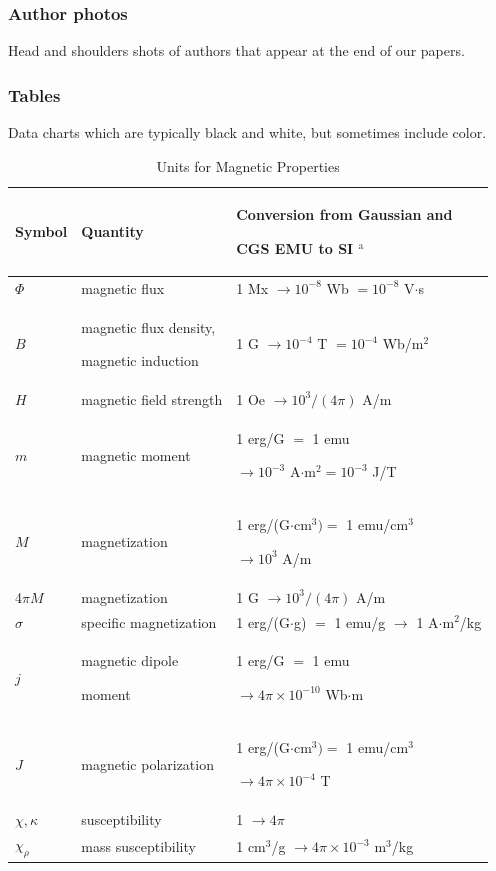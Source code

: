 \documentclass[journal,twoside,web]{ieeecolor}
\begin{document}
\subsubsection{Author photos}
{Head and shoulders shots of authors that appear at the end of our papers. }

\subsubsection{Tables}
{Data charts which are typically black and white, but sometimes include 
color.}

\begin{table}
\caption{Units for Magnetic Properties}
\label{table}
\setlength{\tabcolsep}{3pt}
\begin{tabular}{p{25pt}p{75pt}p{115pt}}
\hline\hline
Symbol& 
Quantity& 
Conversion from Gaussian and \par CGS EMU to SI $^{\mathrm{a}}$ \\
\hline
$\Phi $& 
magnetic flux& 
1 Mx $\to  10^{-8}$ Wb $= 10^{-8}$ V$\cdot $s \\
$B$& 
magnetic flux density, \par magnetic induction& 
1 G $\to  10^{-4}$ T $= 10^{-4}$ Wb/m$^{2}$ \\
$H$& 
magnetic field strength& 
1 Oe $\to  10^{3}/(4\pi )$ A/m \\
$m$& 
magnetic moment& 
1 erg/G $=$ 1 emu \par $\to 10^{-3}$ A$\cdot $m$^{2} = 10^{-3}$ J/T \\
$M$& 
magnetization& 
1 erg/(G$\cdot $cm$^{3}) =$ 1 emu/cm$^{3}$ \par $\to 10^{3}$ A/m \\
4$\pi M$& 
magnetization& 
1 G $\to  10^{3}/(4\pi )$ A/m \\
$\sigma $& 
specific magnetization& 
1 erg/(G$\cdot $g) $=$ 1 emu/g $\to $ 1 A$\cdot $m$^{2}$/kg \\
$j$& 
magnetic dipole \par moment& 
1 erg/G $=$ 1 emu \par $\to 4\pi \times  10^{-10}$ Wb$\cdot $m \\
$J$& 
magnetic polarization& 
1 erg/(G$\cdot $cm$^{3}) =$ 1 emu/cm$^{3}$ \par $\to 4\pi \times  10^{-4}$ T \\
$\chi , \kappa $& 
susceptibility& 
1 $\to  4\pi $ \\
$\chi_{\rho }$& 
mass susceptibility& 
1 cm$^{3}$/g $\to  4\pi \times  10^{-3}$ m$^{3}$/kg \\

\end{tabular}
\end{table}
\end{document}
